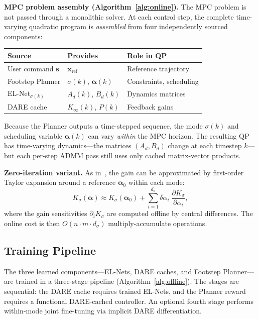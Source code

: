 \documentclass[letterpaper, 10pt, conference]{IEEEtran}
\newcommand{\balpha}{\bm{\alpha}}
\newcommand{\bx}{\bm{x}}
\begin{document}
\textbf{MPC problem assembly (Algorithm~\ref{alg:online}).}
The MPC problem is not passed through a monolithic solver.
At each control step, the complete time-varying quadratic program
is \emph{assembled} from four independently sourced components:

\begin{center}
\small
\begin{tabular}{@{}lll@{}}
\toprule
Source & Provides & Role in QP \\
\midrule
User command $\bm{s}$ & $\bx_{\mathrm{ref}}$ & Reference trajectory \\
Footstep Planner & $\sigma(k)$, $\balpha(k)$ & Constraints, scheduling \\
EL-Net$_{\sigma(k)}$ & $A_d(k)$, $B_d(k)$ & Dynamics matrices \\
DARE cache & $K_\infty(k)$, $P(k)$ & Feedback gains \\
\bottomrule
\end{tabular}
\end{center}

\noindent
Because the Planner outputs a time-stepped sequence,
the mode $\sigma(k)$ and scheduling variable $\balpha(k)$
can vary \emph{within} the MPC horizon.
The resulting QP has time-varying dynamics---the matrices
$(A_d, B_d)$ change at each timestep $k$---but each
per-step ADMM pass still uses only cached matrix-vector
products.

\textbf{Zero-iteration variant.}
As in~\cite{zhang2025flat}, the gain can be approximated by
first-order Taylor expansion around a reference
$\balpha_0$ within each mode:
\begin{equation}\label{eq:K_interp}
  K_\sigma(\balpha) \approx K_\sigma(\balpha_0)
  + \sum_{i=1}^{d_\sigma} \delta\alpha_i \;
    \frac{\partial K_\sigma}{\partial \alpha_i},
\end{equation}
where the gain sensitivities $\partial_i K_\sigma$
are computed offline by central differences.
The online cost is then $O(n \cdot m \cdot d_\sigma)$
multiply-accumulate operations.

\subsection{Training Pipeline}\label{sec:training}

The three learned components---EL-Nets, DARE caches, and
Footstep Planner---are trained in a three-stage pipeline
(Algorithm~\ref{alg:offline}).
The stages are sequential: the DARE cache requires
trained EL-Nets, and the Planner reward requires a
functional DARE-cached controller.
An optional fourth stage performs within-mode joint
fine-tuning via implicit DARE differentiation.
\end{document}
